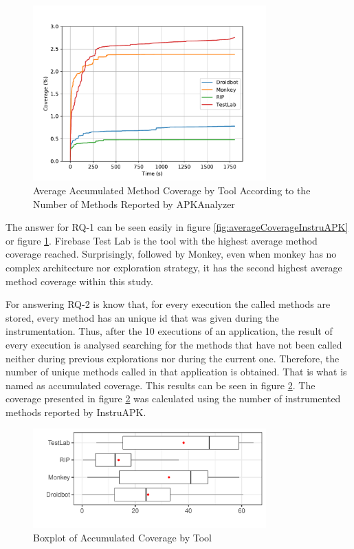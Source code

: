 \begin{figure}[h]
\centering
\includegraphics[width=0.8\textwidth]{../Figures/averageCoverageAPKAnalyzer.pdf}
\caption{Average Accumulated Method Coverage by Tool According to the Number of Methods Reported by APKAnalyzer}\label{fig:averageCoverageAPKAnalyzer}
\end{figure}


The answer for RQ-1 can be seen easily in figure \ref{fig:averageCoverageInstruAPK} or figure \ref{fig:averageCoverageAPKAnalyzer}. Firebase Test Lab is the tool with the highest average method coverage reached. Surprisingly, followed by Monkey, even when monkey has no complex architecture nor exploration strategy, it has the second highest average method coverage within this study.

For answering RQ-2 is know that, for every execution the called methods are stored, every method has an unique id that was given during the instrumentation. Thus, after the 10 executions of an application, the result of every execution is analysed searching for the methods that have not been called neither during previous explorations nor during the current one. Therefore, the number of unique methods called in that application is obtained. That is what is named as accumulated coverage. This results can be seen in figure \ref{fig:boxplotAccumulated}. The coverage presented in figure \ref{fig:boxplotAccumulated} was calculated using the number of instrumented methods reported by InstruAPK. 

\begin{figure}[h]
\centering
\includegraphics[width=0.8\textwidth]{../Figures/boxplotAccumulated.pdf}
\caption{Boxplot of Accumulated Coverage by Tool}\label{fig:boxplotAccumulated}
\end{figure}

